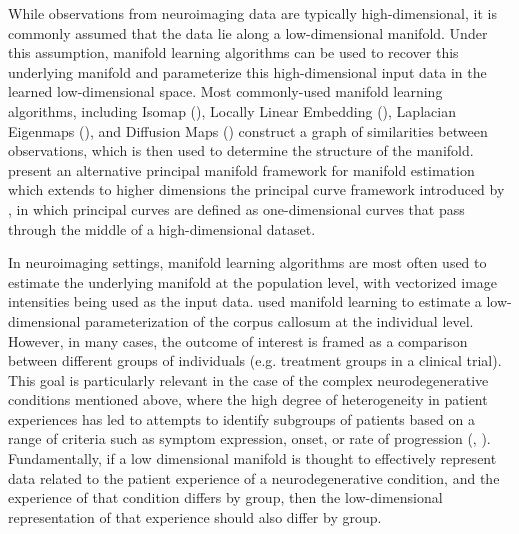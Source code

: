\documentclass[11pt,reqno]{article}
\theoremstyle{definition}
\begin{document}
While observations from neuroimaging data are typically high-dimensional, it is commonly assumed that the data lie along a low-dimensional manifold. Under this assumption, manifold learning algorithms can be used to recover this underlying manifold and parameterize this high-dimensional input data in the learned low-dimensional space. Most commonly-used manifold learning algorithms, including Isomap (\cite{tenenbaumGlobalGeometricFramework2000}), Locally Linear Embedding (\cite{roweisNonlinearDimensionalityReduction2000}), Laplacian Eigenmaps (\cite{belkinLaplacianEigenmapsDimensionality2003}), and Diffusion Maps (\cite{coifmanDiffusionMaps2006}) construct a graph of similarities between observations, which is then used to determine the structure of the manifold. \cite{mengPrincipalManifoldEstimation2021} present an alternative principal manifold framework for manifold estimation which extends to higher dimensions the principal curve framework introduced by \cite{hastiePrincipalCurves1989}, in which principal curves are defined as one-dimensional curves that pass through the middle of a high-dimensional dataset. 

In neuroimaging settings, manifold learning algorithms are most often used to estimate the underlying manifold at the population level, with vectorized image intensities being used as the input data. \cite{yueParameterizationWhiteMatter2016} used manifold learning to estimate a low-dimensional parameterization of the corpus callosum at the individual level. However, in many cases, the outcome of interest is framed as a comparison between different groups of individuals (e.g. treatment groups in a clinical trial). This goal is particularly relevant in the case of the complex neurodegenerative conditions mentioned above, where the high degree of heterogeneity in patient experiences has led to attempts to identify subgroups of patients based on a range of criteria such as symptom expression, onset, or rate of progression (\cite{ferreiraBiologicalSubtypesAlzheimer2020}, \cite{venutoPredictingAmbulatoryCapacity}). Fundamentally, if a low dimensional manifold is thought to effectively represent data related to the patient experience of a neurodegenerative condition, and the experience of that condition differs by group, then the low-dimensional representation of that experience should also differ by group.
\end{document}
